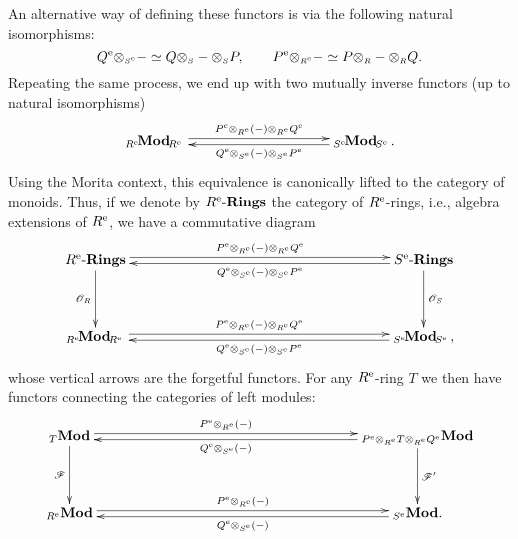 \documentclass[reqno, a4paper, 10pt]{amsart}
\numberwithin{equation}{section}
\theoremstyle{plain}
\theoremstyle{definition}
\theoremstyle{remark}
\begin{document}
An alternative way of defining these functors is via the following natural isomorphisms:
$$
{{Q^{\rm e}}}{\otimes_{\scriptscriptstyle{{{S^{\rm e}}}}}}- \simeq Q{\otimes_{\scriptscriptstyle{{S}}}}-{\otimes_{\scriptscriptstyle{{S}}}}P, \qquad {{P^{\rm e}}}{\otimes_{\scriptscriptstyle{{\scriptscriptstyle{{R^{\rm e}}}}}}}- \simeq P{\otimes_{\scriptscriptstyle{{R}}}}-{\otimes_{\scriptscriptstyle{{R}}}}Q.
$$
Repeating  the same process, we end up with two mutually inverse functors (up to natural isomorphisms)
$$
\xymatrix@C=100pt{ {{}_{{{{R^{\rm e}}} \!}} {{\mathbf{Mod}}}_{{\! {{R^{\rm e}}}}}\,}  \ar@<.5ex>[r]^-{{{P^{\rm e}}}{\otimes_{\scriptscriptstyle{{\scriptscriptstyle{{R^{\rm e}}}}}}}(-){\otimes_{\scriptscriptstyle{{\scriptscriptstyle{{R^{\rm e}}}}}}}{{Q^{\rm e}}}} &   {{}_{{{{S^{\rm e}}} \!}} {{\mathbf{Mod}}}_{{\! {{S^{\rm e}}}}}\,}.  \ar@<.5ex>[l]^-{{{Q^{\rm e}}}{\otimes_{\scriptscriptstyle{{{S^{\rm e}}}}}}(-){\otimes_{\scriptscriptstyle{{{S^{\rm e}}}}}}{{P^{\rm e}}}} }
$$
Using the Morita context, this equivalence is canonically lifted to the category of monoids. 
Thus, if we  denote by ${{{R^{\rm e}}}\text{-}\mathbf{Rings}}$ the category of ${{R^{\rm e}}}$-rings, i.e., algebra extensions of ${{R^{\rm e}}}$, 
we have a commutative diagram
$$
\xymatrix@C=90pt@R=40pt{{{{R^{\rm e}}}\text{-}\mathbf{Rings}}\ar@<.5ex>[rr]^-{{{P^{\rm e}}}{\otimes_{\scriptscriptstyle{{\scriptscriptstyle{{R^{\rm e}}}}}}}(-){\otimes_{\scriptscriptstyle{{\scriptscriptstyle{{R^{\rm e}}}}}}}{{Q^{\rm e}}}} \ar@{->}_-{{\mathscr{{O}}}_R}[d] & &   {{{S^{\rm e}}}\text{-}\mathbf{Rings}}  \ar@{->}^-{{\mathscr{{O}}}_S}[d] \ar@<.5ex>[ll]^-{{{Q^{\rm e}}}{\otimes_{\scriptscriptstyle{{{S^{\rm e}}}}}}(-){\otimes_{\scriptscriptstyle{{{S^{\rm e}}}}}}{{P^{\rm e}}}}  \\  {{}_{{{{R^{\rm e}}} \!}} {{\mathbf{Mod}}}_{{\! {{R^{\rm e}}}}}\,}  \ar@<.5ex>[rr]^-{{{P^{\rm e}}}{\otimes_{\scriptscriptstyle{{\scriptscriptstyle{{R^{\rm e}}}}}}}(-){\otimes_{\scriptscriptstyle{{\scriptscriptstyle{{R^{\rm e}}}}}}}{{Q^{\rm e}}}} & &   {{}_{{{{S^{\rm e}}} \!}} {{\mathbf{Mod}}}_{{\! {{S^{\rm e}}}}}\,},  \ar@<.5ex>[ll]^-{{{Q^{\rm e}}}{\otimes_{\scriptscriptstyle{{{S^{\rm e}}}}}}(-){\otimes_{\scriptscriptstyle{{{S^{\rm e}}}}}}{{P^{\rm e}}}}  }
$$
whose vertical arrows are the forgetful functors.  For any ${{R^{\rm e}}}$-ring $T$ we then have  
functors connecting the categories of left modules:
\begin{equation}\label{Eq:modules}
\xymatrix@C=90pt@R=40pt{{}_T{\mathbf{Mod}}\ar@<.5ex>[rr]^-{{{P^{\rm e}}}{\otimes_{\scriptscriptstyle{{\scriptscriptstyle{{R^{\rm e}}}}}}}(-)} \ar@{->}_-{{\mathscr{{F}}}}[d] & &   {}_{{{P^{\rm e}}}{\otimes_{\scriptscriptstyle{{\scriptscriptstyle{{R^{\rm e}}}}}}}T{\otimes_{\scriptscriptstyle{{\scriptscriptstyle{{R^{\rm e}}}}}}}{{Q^{\rm e}}}}{\mathbf{Mod}}  \ar@{->}^-{{\mathscr{{F}}}'}[d] \ar@<.5ex>[ll]^-{{{Q^{\rm e}}}{\otimes_{\scriptscriptstyle{{{S^{\rm e}}}}}}(-)}  \\   {}_{{R^{\rm e}}}{\mathbf{Mod}}   \ar@<.5ex>[rr]^-{{{P^{\rm e}}}{\otimes_{\scriptscriptstyle{{\scriptscriptstyle{{R^{\rm e}}}}}}}(-)} & &   {}_{{S^{\rm e}}}{\mathbf{Mod}}.  \ar@<.5ex>[ll]^-{{{Q^{\rm e}}}{\otimes_{\scriptscriptstyle{{{S^{\rm e}}}}}}(-)}  }
\end{equation}
 
\end{document}
